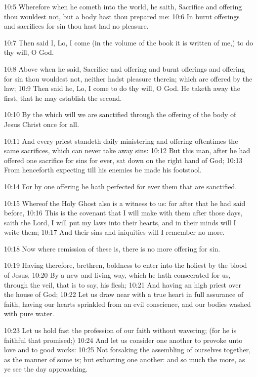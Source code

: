 10:5 Wherefore when he cometh into the world, he saith, Sacrifice and offering thou wouldest not, but a body hast thou prepared me: 10:6 In burnt offerings and sacrifices for sin thou hast had no pleasure.

10:7 Then said I, Lo, I come (in the volume of the book it is written of me,) to do thy will, O God.

10:8 Above when he said, Sacrifice and offering and burnt offerings and offering for sin thou wouldest not, neither hadst pleasure therein; which are offered by the law; 10:9 Then said he, Lo, I come to do thy will, O God. He taketh away the first, that he may establish the second.

10:10 By the which will we are sanctified through the offering of the body of Jesus Christ once for all.

10:11 And every priest standeth daily ministering and offering oftentimes the same sacrifices, which can never take away sins: 10:12 But this man, after he had offered one sacrifice for sins for ever, sat down on the right hand of God; 10:13 From henceforth expecting till his enemies be made his footstool.

10:14 For by one offering he hath perfected for ever them that are sanctified.

10:15 Whereof the Holy Ghost also is a witness to us: for after that he had said before, 10:16 This is the covenant that I will make with them after those days, saith the Lord, I will put my laws into their hearts, and in their minds will I write them; 10:17 And their sins and iniquities will I remember no more.

10:18 Now where remission of these is, there is no more offering for sin.

10:19 Having therefore, brethren, boldness to enter into the holiest by the blood of Jesus, 10:20 By a new and living way, which he hath consecrated for us, through the veil, that is to say, his flesh; 10:21 And having an high priest over the house of God; 10:22 Let us draw near with a true heart in full assurance of faith, having our hearts sprinkled from an evil conscience, and our bodies washed with pure water.

10:23 Let us hold fast the profession of our faith without wavering; (for he is faithful that promised;) 10:24 And let us consider one another to provoke unto love and to good works: 10:25 Not forsaking the assembling of ourselves together, as the manner of some is; but exhorting one another: and so much the more, as ye see the day approaching.

